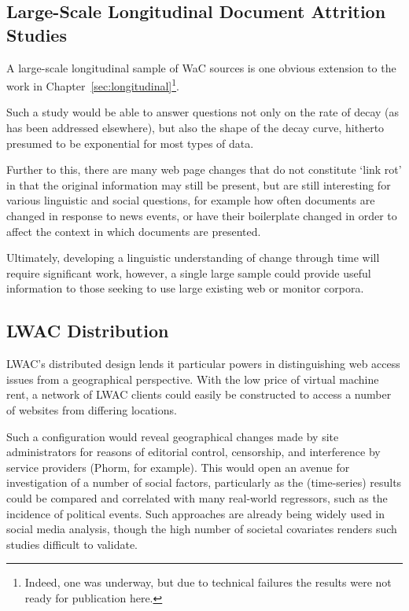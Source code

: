 %



\subsection{Large-Scale Longitudinal Document Attrition Studies}
A large-scale longitudinal sample of WaC sources is one obvious extension to the work in Chapter~\ref{sec:longitudinal}\footnote{Indeed, one was underway, but due to technical failures the results were not ready for publication here.}.

Such a study would be able to answer questions not only on the rate of decay (as has been addressed elsewhere), but also the shape of the decay curve, hitherto presumed to be exponential for most types of data.

Further to this, there are many web page changes that do not constitute `link rot' in that the original information may still be present, but are still interesting for various linguistic and social questions, for example how often documents are changed in response to news events, or have their boilerplate changed in order to affect the context in which documents are presented.

Ultimately, developing a linguistic understanding of change through time will require significant work, however, a single large sample could provide useful information to those seeking to use large existing web or monitor corpora.

\subsection{LWAC Distribution}
LWAC's distributed design lends it particular powers in distinguishing web access issues from a geographical perspective.  With the low price of virtual machine rent, a network of LWAC clients could easily be constructed to access a number of websites from differing locations.

Such a configuration would reveal geographical changes made by site administrators for reasons of editorial control, censorship, and interference by service providers (Phorm\cite{clayton2008phorm}, for example).  This would open an avenue for investigation of a number of social factors, particularly as the (time-series) results could be compared and correlated with many real-world regressors, such as the incidence of political events.  Such approaches are already being widely used in social media analysis\cite{achrekar2011predicting,bollen2011twitter}, though the high number of societal covariates renders such studies difficult to validate.

